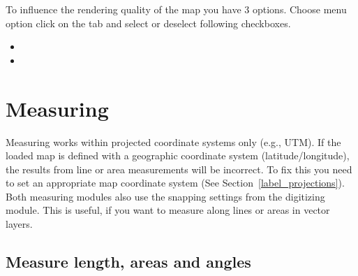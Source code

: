 \label{label_renderquality}

To influence the rendering quality of the map you have 3 options. Choose menu
option  \arrow {} click on the
 tab and select or deselect following checkboxes.

\begin{itemize}
\item {}
\item {}
\end{itemize}

\section{Measuring}\label{sec:measure}

Measuring works within projected coordinate systems only (e.g., UTM). If
the loaded map is defined with a geographic coordinate system
(latitude/longitude), the results from line or area measurements will be
incorrect. To fix this you need to set an appropriate map coordinate system
(See Section~\ref{label_projections}). Both measuring modules also use the
snapping settings from the digitizing module. This is useful, if you want to
measure along lines or areas in vector layers.

\subsection{Measure length, areas and angles}

